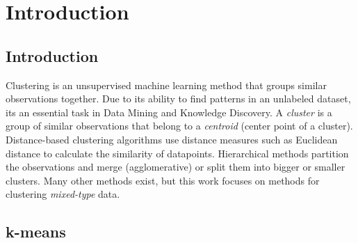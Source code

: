 \chapter{Introduction}


\section{Introduction}

Clustering is an unsupervised machine learning method that groups similar observations together. Due to its ability to find patterns in an unlabeled dataset, its an essential task in Data Mining and Knowledge Discovery. A \textit{cluster} is a group of similar observations that belong to a \textit{centroid} (center point of a cluster). Distance-based clustering algorithms use distance measures such as Euclidean distance to calculate the similarity of datapoints. Hierarchical methods partition the observations and merge (agglomerative) or split them into bigger or smaller clusters. Many other methods exist, but this work focuses on methods for clustering \textit{mixed-type} data. \cite{mixed_type_survey_2019}

\section{k-means}

